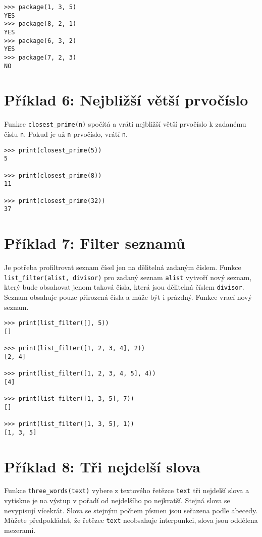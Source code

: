 \documentclass{paper}
\begin{document}
\begin{lstlisting}
>>> package(1, 3, 5)
YES
>>> package(8, 2, 1)
YES
>>> package(6, 3, 2)
YES
>>> package(7, 2, 3)
NO

\end{lstlisting}


\section*{Příklad 6: Nejbližší větší prvočíslo}
\noindent
Funkce \verb!closest_prime(n)! spočítá a vráti nejbližší větší prvočíslo k zadanému číslu \verb!n!. Pokud je už \verb!n! prvočíslo, vrátí \verb!n!. 


\begin{lstlisting}
>>> print(closest_prime(5))
5

>>> print(closest_prime(8))
11

>>> print(closest_prime(32))
37
\end{lstlisting}



\section*{Příklad 7: Filter seznamů}

\noindent
Je potřeba profiltrovat seznam čísel jen na dělitelná zadaným číslem. Funkce \verb!list_filter(alist, divisor)! pro zadaný seznam \verb!alist! vytvoří nový seznam, který bude obsahovat jenom taková čísla, která jsou dělitelná číslem \verb!divisor!. Seznam obsahuje pouze přirozená čísla a může být i prázdný. Funkce vrací nový seznam.


\begin{lstlisting}
>>> print(list_filter([], 5))
[]

>>> print(list_filter([1, 2, 3, 4], 2))
[2, 4]

>>> print(list_filter([1, 2, 3, 4, 5], 4))
[4]

>>> print(list_filter([1, 3, 5], 7))
[]

>>> print(list_filter([1, 3, 5], 1))
[1, 3, 5]
\end{lstlisting}



\section*{Příklad 8: Tři nejdelší slova}
\noindent
Funkce \verb!three_words(text)! vybere z textového řetězce \verb!text! tři nejdelší slova a vytiskne je na výstup v pořadí od nejdelšího po nejkratší. Stejná slova se nevypisují vícekrát. Slova se stejným počtem písmen jsou seřazena podle abecedy. Můžete předpokládat, že řetězec \verb!text! neobsahuje interpunkci, slova jsou oddělena mezerami.
\end{document}
